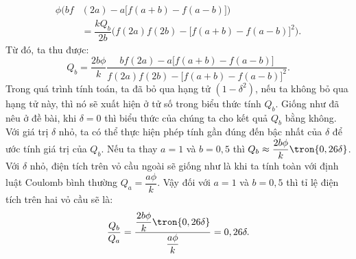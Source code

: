 \begin{loigiai}
\begin{enumerate}[1)]
        \[\begin{aligned}
             \phi\Big(bf&(2a)-a\big[f(a+b)-f(a-b)\big]\Big)\\
             &=\dfrac{kQ_b}{2b}\Big(f(2a)f(2b)-\big[f(a+b)-f(a-b)\big]^2\Big). 
             \end{aligned}\tag{8} \]
        Từ đó, ta thu được:
            \[Q_b=\dfrac{2b\phi}{k}\dfrac{bf(2a)-a\big[f(a+b)-f(a-b)\big]}{f(2a)f(2b)-\big[f(a+b)-f(a-b)\big]^2}.\tag{9} \]
        Trong quá trình tính toán, ta đã bỏ qua hạng tử $(1-\delta^2)$, nếu ta không bỏ qua hạng tử này, thì nó sẽ xuất hiện ở tử số trong biểu thức tính $Q_b$. Giống như đã nêu ở đề bài, khi $\delta=0$ thì biểu thức của chúng ta cho kết quả $Q_b$ bằng không. Với giá trị $\delta$ nhỏ, ta có thể thực hiện phép tính gần đúng đến bậc nhất của $\delta$ để ước tính giá trị của $Q_b$. Nếu ta thay $a=1$ và $b=0,5$ thì $Q_b\approx\dfrac{2b\phi}{k}\tron{0,26\delta}$. Với $\delta$ nhỏ, điện tích trên vỏ cầu ngoài sẽ giống như là khi ta tính toàn với định luật Coulomb bình thường $Q_a=\dfrac{a\phi}{k}$. Vậy đối với $a=1$ và $b=0,5$ thì tỉ lệ điện tích trên hai vỏ cầu sẽ là:
        \begin{equation}
            \dfrac{Q_b}{Q_a}=\dfrac{\dfrac{2b\phi}{k}\tron{0,26\delta}}{\dfrac{a\phi}{k}}=0,26\delta.
        \end{equation}
    \end{enumerate}
    \end{loigiai}    
    
